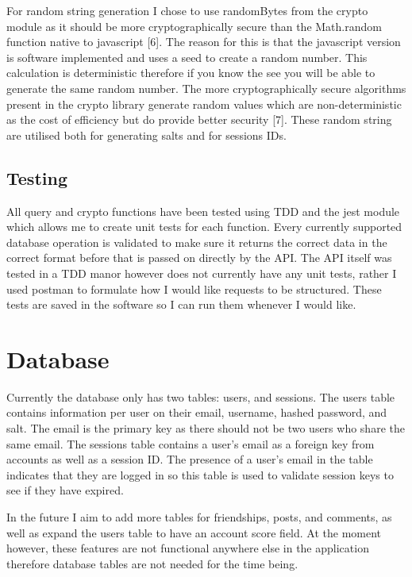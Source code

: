 \documentclass[]{final_report}
\begin{document}
For random string generation I chose to use randomBytes from the crypto module as it should be more cryptographically secure than the Math.random  function native to javascript [6]. The reason for this is that the javascript version is software implemented and uses a seed to create a random number. This calculation is deterministic therefore if you know the see you will be able to generate the same random number. The more cryptographically secure algorithms present in the crypto library generate random values which are non-deterministic as the cost of efficiency but do provide better security [7]. These random string are utilised both for generating salts and for sessions IDs.

\subsection{Testing}

All query and crypto functions have been tested using TDD and the jest module which allows me to create unit tests for each function. Every currently supported database operation is validated to make sure it returns the correct data in the correct format before that is passed on directly by the API. The API itself was tested in a TDD manor however does not currently have any unit tests, rather I used postman to formulate how I would like requests to be structured. These tests are saved in the software so I can run them whenever I would like.

\section{Database}

Currently the database only has two tables: users, and sessions. The users table contains information per user on their email, username, hashed password, and salt. The email is the primary key as there should not be two users who share the same email. The sessions table contains a user's email as a foreign key from accounts as well as a session ID. The presence of a user's email in the table indicates that they are logged in so this table is used to validate session keys to see if they have expired.

In the future I aim to add more tables for friendships, posts, and comments, as well as expand the users table to have an account score field. At the moment however, these features are not functional anywhere else in the application therefore database tables are not needed for the time being.
\end{document}
